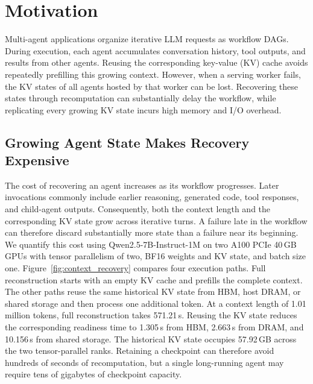 \iffalse
\section{Motivation} \label{sec:motivation} 

Multi-agent applications organize iterative LLM requests as workflow DAGs. During execution, each agent accumulates conversation history, tool outputs, and results from other agents. Reusing the corresponding key-value (KV) cache avoids repeatedly prefilling this growing context. However, when a serving worker fails, the KV states of all agents hosted by that worker can be lost. Recovering these states through recomputation can substantially delay the workflow, while replicating every growing KV state incurs high memory and I/O overhead. 





\subsection{Growing Agent State Makes Recovery Expensive} \label{sec:motivation:growth} 


The cost of recovering an agent increases as its workflow progresses. Later invocations commonly include earlier reasoning, generated code, tool responses, and child-agent outputs. Consequently, both the context length and the corresponding KV state grow across iterative turns. A failure late in the workflow can therefore discard substantially more state than a failure near its beginning. We quantify this cost using Qwen2.5-7B-Instruct-1M on two A100 PCIe 40\,GB GPUs with tensor parallelism of two, BF16 weights and KV state, and batch size one. Figure~\ref{fig:context_recovery} compares four execution paths. Full reconstruction starts with an empty KV cache and prefills the complete context. The other paths reuse the same historical KV state from HBM, host DRAM, or shared storage and then process one additional token. At a context length of 1.01 million tokens, full reconstruction takes 571.21\,s. Reusing the KV state reduces the corresponding readiness time to 1.305\,s from HBM, 2.663\,s from DRAM, and 10.156\,s from shared storage. The historical KV state occupies 57.92\,GB across the two tensor-parallel ranks. Retaining a checkpoint can therefore avoid hundreds of seconds of recomputation, but a single long-running agent may require tens of gigabytes of checkpoint capacity. 

